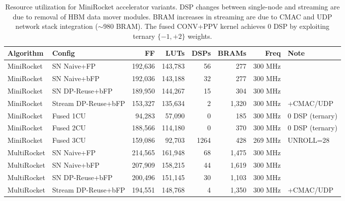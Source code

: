 \begin{table}[t]
\centering
\caption{Resource utilization for MiniRocket accelerator variants. DSP changes between single-node and streaming are due to removal of HBM data mover modules. BRAM increases in streaming are due to CMAC and UDP network stack integration ($\sim$980 BRAM). The fused CONV+PPV kernel achieves 0 DSP by exploiting ternary $\{-1, +2\}$ weights.}
\label{tab:resource_annotated}
\begin{tabular}{l l r r r r r l}
\toprule
Algorithm & Config & FF & LUTs & DSPs & BRAMs & Freq & Note \\
\midrule
MiniRocket & SN Naive+FP & 192,636 & 143,783 & 56 & 277 & 300 MHz &  \\
MiniRocket & SN Naive+bFP & 192,036 & 143,188 & 32 & 277 & 300 MHz &  \\
MiniRocket & SN DP-Reuse+bFP & 189,950 & 144,267 & 15 & 304 & 300 MHz &  \\
MiniRocket & Stream DP-Reuse+bFP & 153,327 & 135,634 & 2 & 1,320 & 300 MHz & +CMAC/UDP \\
\addlinespace
MiniRocket & Fused 1CU & 94,283 & 57,090 & 0 & 185 & 300 MHz & 0 DSP (ternary) \\
MiniRocket & Fused 2CU & 188,566 & 114,180 & 0 & 370 & 300 MHz & 0 DSP (ternary) \\
MiniRocket & Fused 3CU & 159,086 & 92,703 & 1264 & 428 & 269 MHz & UNROLL=28 \\
\addlinespace
MultiRocket & SN Naive+FP & 214,565 & 161,948 & 68 & 1,475 & 300 MHz &  \\
MultiRocket & SN Naive+bFP & 207,909 & 158,215 & 44 & 1,619 & 300 MHz &  \\
MultiRocket & SN DP-Reuse+bFP & 200,496 & 151,145 & 30 & 1,103 & 300 MHz &  \\
MultiRocket & Stream DP-Reuse+bFP & 194,551 & 148,768 & 4 & 1,350 & 300 MHz & +CMAC/UDP \\
\bottomrule
\end{tabular}
\end{table}
